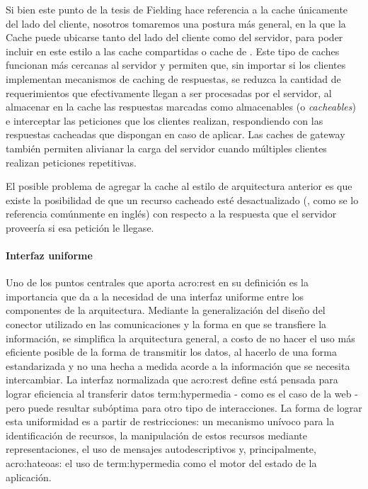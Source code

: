 Si bien este punto de la tesis de Fielding hace referencia a la cache únicamente del lado del cliente, nosotros tomaremos una postura más general, en la que la Cache puede ubicarse tanto del lado del cliente como del servidor, para poder incluir en este estilo a las cache compartidas o cache de . Este tipo de caches funcionan más cercanas al servidor y permiten que, sin importar si los clientes implementan mecanismos de caching de respuestas, se reduzca la cantidad de requerimientos que efectivamente llegan a ser procesadas por el servidor, al almacenar en la cache las respuestas marcadas como almacenables (o \textit{cacheables}) e interceptar las peticiones que los clientes realizan, respondiendo con las respuestas cacheadas que dispongan en caso de aplicar. Las caches de gateway también permiten alivianar la carga del servidor cuando múltiples clientes realizan peticiones repetitivas.

El posible problema de agregar la cache al estilo de arquitectura anterior es que existe la posibilidad de que un recurso cacheado esté desactualizado (, como se lo referencia comúnmente en inglés) con respecto a la respuesta que el servidor proveería si esa petición le llegase.


\paragraph{Interfaz uniforme}

Uno de los puntos centrales que aporta \gls{acro:rest} en su definición es la importancia que da a la necesidad de una interfaz uniforme entre los componentes de la arquitectura. Mediante la generalización del diseño del conector utilizado en las comunicaciones y la forma en que se transfiere la información, se simplifica la arquitectura general, a costo de no hacer el uso más eficiente posible de la forma de transmitir los datos, al hacerlo de una forma estandarizada y no una hecha a medida acorde a la información que se necesita intercambiar. La interfaz normalizada que \gls{acro:rest} define está pensada para lograr eficiencia al transferir datos \gls{term:hypermedia} - como es el caso de la web - pero puede resultar subóptima para otro tipo de interacciones. La forma de lograr esta uniformidad es a partir de restricciones: un mecanismo unívoco para la identificación de recursos, la manipulación de estos recursos mediante representaciones, el uso de mensajes autodescriptivos y, principalmente, \acrfull{acro:hateoas}: el uso de \gls{term:hypermedia} como el motor del estado de la aplicación.


